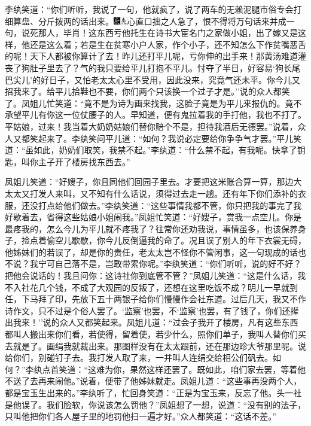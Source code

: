 李纨笑道：``你们听听，我说了一句，他就疯了，说了两车的无赖泥腿市俗专会打细算盘、分斤拨两的话出来。{\includegraphics[width=3mm]{../Images/00004}\includegraphics[width=3mm]{../Images/00012}\footnotesize \kaishu 心直口拙之人急了，恨不得将万句话来并成一句，说死那人，毕肖！}这东西亏他托生在诗书大宦名门之家做小姐，出了嫁又是这样，他还是这么着；若是生在贫寒小户人家，作个小子，还不知怎么下作贫嘴恶舌的呢！天下人都被你算计了去！昨儿还打平儿呢，亏你伸的出手来！那黄汤难道灌丧了狗肚子里去了？气的我只要给平儿打抱不平儿。忖夺了半日，好容易`狗长尾巴尖儿'的好日子，又怕老太太心里不受用，因此没来，究竟气还未平。你今儿又招我来了。给平儿拾鞋也不要，你们两个只该换一个过子才是。''说的众人都笑了。凤姐儿忙笑道：``竟不是为诗为画来找我，这脸子竟是为平儿来报仇的。竟不承望平儿有你这一位仗腰子的人。早知道，便有鬼拉着我的手打他，我也不打了。平姑娘，过来！我当着大奶奶姑娘们替你赔个不是，担待我酒后无德罢。''说着，众人又都笑起来了。李纨笑问平儿道：``如何？我说必定要给你争争气才罢。''平儿笑道：``虽如此，奶奶们取笑，我禁不起。''李纨道：``什么禁不起，有我呢。快拿了钥匙，叫你主子开了楼房找东西去。''

凤姐儿笑道：``好嫂子，你且同他们回园子里去。才要把这米账合算一算，那边大太太又打发人来叫，又不知有什么话说，须得过去走一趟。还有年下你们添补的衣服，还没打点给他们做去。''李纨笑道：``这些事情我都不管，你只把我的事完了我好歇着去，省得这些姑娘小姐闹我。''凤姐忙笑道：``好嫂子，赏我一点空儿。你是最疼我的，怎么今儿为平儿就不疼我了？往常你还劝我说，事情虽多，也该保养身子，捡点着偷空儿歇歇，你今儿反倒逼我的命了。况且误了别人的年下衣裳无碍，他姊妹们的若误了，却是你的责任，老太太岂不怪你不管闲事，这一句现成的话也不说？我宁可自己落不是，岂敢带累你呢。''李纨笑道：``你们听听，说的好不好？把他会说话的！我且问你：这诗社你到底管不管？''凤姐儿笑道：``这是什么话，我不入社花几个钱，不成了大观园的反叛了，还想在这里吃饭不成？明儿一早就到任，下马拜了印，先放下五十两银子给你们慢慢作会社东道。过后几天，我又不作诗作文，只不过是个俗人罢了。`监察'也罢，不`监察'也罢，有了钱了，你们还撵出我来！''说的众人又都笑起来。凤姐儿道：``过会子我开了楼房，凡有这些东西都叫人搬出来你们看，若使得，留着使，若少什么，照你们单子，我叫人替你们买去就是了。画绢我就裁出来。那图样没有在太太跟前，还在那边珍大爷那里呢。说给你们，别碰钉子去。我打发人取了来，一并叫人连绢交给相公们矾去。如何？''李纨点首笑道：``这难为你，果然这样还罢了。既如此，咱们家去罢，等着他不送了去再来闹他。''说着，便带了他姊妹就走。凤姐儿道：``这些事再没两个人，都是宝玉生出来的。''李纨听了，忙回身笑道：``正是为宝玉来，反忘了他。头一社是他误了。我们脸软，你说该怎么罚他？''凤姐想了一想，说道：``没有别的法子，只叫他把你们各人屋子里的地罚他扫一遍才好。''众人都笑道：``这话不差。''

